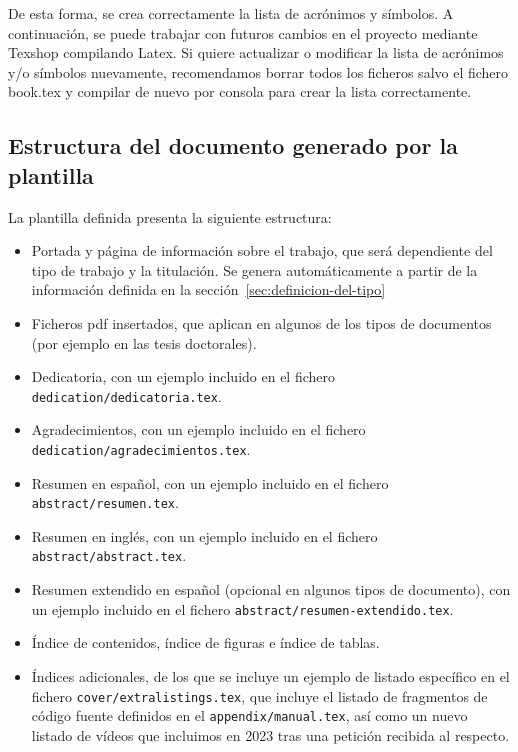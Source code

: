{  De esta forma, se crea correctamente la lista de acrónimos y símbolos. A continuación, se puede trabajar con futuros cambios en el proyecto mediante Texshop compilando Latex. Si quiere actualizar o modificar la lista de acrónimos y/o símbolos nuevamente, recomendamos borrar todos los ficheros salvo el fichero book.tex y compilar de nuevo por consola para crear la lista correctamente.



  \subsection{Estructura del documento generado por la plantilla}
  \label{sec:estr-del-docum}

  La plantilla definida presenta la siguiente estructura:

  \begin{itemize}

    \item Portada y página de información sobre el trabajo, que será dependiente del tipo de trabajo y la titulación. Se genera automáticamente a partir de la información definida en la sección~\ref{sec:definicion-del-tipo}

    \item Ficheros pdf insertados, que aplican en algunos de los tipos de documentos (por ejemplo en las tesis doctorales).

    \item Dedicatoria, con un ejemplo incluido en el fichero \texttt{dedication/dedicatoria.tex}.
    \item Agradecimientos, con un ejemplo incluido en el fichero \texttt{dedication/agradecimientos.tex}.


    \item Resumen en español, con un ejemplo incluido en el fichero \texttt{abstract/resumen.tex}.
    \item Resumen en inglés, con un ejemplo incluido en el fichero \texttt{abstract/abstract.tex}.
    \item Resumen extendido en español (opcional en algunos tipos de documento), con un ejemplo incluido en el fichero \texttt{abstract/resumen-extendido.tex}.

    \item Índice de contenidos, índice de figuras e índice de tablas.
    \item Índices adicionales, de los que se incluye un ejemplo de listado específico en el fichero \texttt{cover/extralistings.tex}, que incluye el listado de fragmentos de código fuente definidos en el \texttt{appendix/manual.tex}, así como un nuevo listado de vídeos que incluimos en 2023 tras una petición recibida al respecto.


\end{itemize}}
